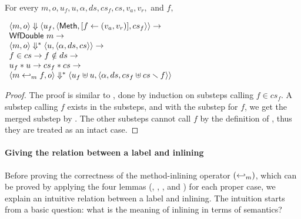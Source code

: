 \begin{lemma}
  \label{lem-inlinedmm-meth2}
  \mbox{}\\
  For every $m, o, u_f, u, \alpha, ds, cs_f, cs, v_a, v_r,$ and $f,$
  \begin{center}
    \begin{math}
      \begin{array}{l}
        \langle m, o \rangle \Downarrow \langle u_f, \langle \textsf{Meth},  [ f \leftarrow (v_a, v_r) ], cs_f \rangle \rangle \to \\
        \textsf{WfDouble}\ m \to \\
        \langle m, o \rangle \Downarrow^{\ast} \langle u, \langle \alpha, ds, cs \rangle \rangle \to \\
        f \in cs \to f \notin ds \to \\
        u_f \ast u \to cs_f \ast cs \to \\
        \langle m \hookleftarrow_{m}{} f, o \rangle \Downarrow^{\ast} \langle u_f \uplus u, \langle \alpha, ds, cs_f \uplus cs \smallsetminus{} f \rangle \rangle
      \end{array}
    \end{math}
  \end{center}
\end{lemma}
\begin{proof}
  The proof is similar to , done by
  induction on substeps calling $f \in cs_f$. A substep calling $f$
  exists in the substeps, and with the substep for $f$, we get the
  merged substep by . The other
  substeps cannot call $f$ by the definition of \Substeps{}, thus they
  are treated as an intact case.
\end{proof}

\paragraph{Giving the relation between a label and inlining}

Before proving the correctness of the method-inlining operator
$(\hookleftarrow_{m})$, which can be proved by applying the four lemmas
(, ,
, and ) for
each proper case, we explain an intuitive relation between a label and
inlining. The intuition starts from a basic question: what is the
meaning of inlining in terms of semantics?

